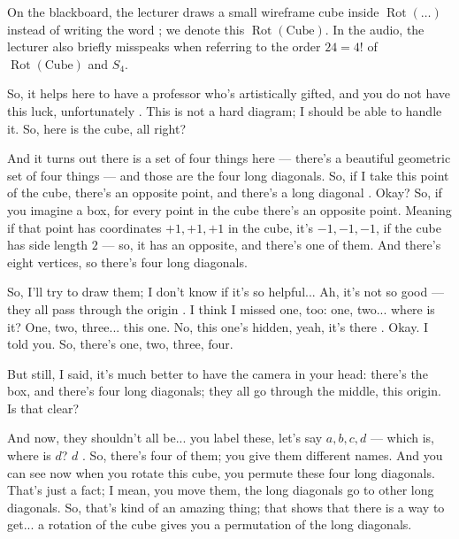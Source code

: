 \begin{aiNote}
On the blackboard, the lecturer draws a small wireframe cube inside $\operatorname{Rot}(\dots)$ instead of writing the word ; we denote this $\operatorname{Rot}(\text{Cube})$. In the audio, the lecturer also briefly misspeaks  when referring to the order $24 = 4!$ of $\operatorname{Rot}(\text{Cube})$ and $S_4$.
\end{aiNote}

\begin{speech}[00:38:42 - 00:40:54]
So, it helps here to have a professor who's artistically gifted, and you do not have this luck, unfortunately . This is not a hard diagram; I should be able to handle it. So, here is the cube, all right?

And it turns out there is a set of four things here --- there's a beautiful geometric set of four things --- and those are the four long diagonals. So, if I take this point of the cube, there's an opposite point, and there's a long diagonal . Okay? So, if you imagine a box, for every point in the cube there's an opposite point. Meaning if that point has coordinates $+1, +1, +1$ in the cube, it's $-1, -1, -1$, if the cube has side length $2$ --- so, it has an opposite, and there's one of them. And there's eight vertices, so there's four long diagonals.

So, I'll try to draw them; I don't know if it's so helpful...  Ah, it's not so good --- they all pass through the origin . I think I missed one, too: one, two... where is it? One, two, three... this one. No, this one's hidden, yeah, it's there . Okay. I told you. So, there's one, two, three, four.

But still, I said, it's much better to have the camera in your head: there's the box, and there's four long diagonals; they all go through the middle, this origin. Is that clear?

And now, they shouldn't all be... you label these, let's say $a, b, c, d$ --- which is, where is $d$? $d$ . So, there's four of them; you give them different names. And you can see now when you rotate this cube, you permute these four long diagonals. That's just a fact; I mean, you move them, the long diagonals go to other long diagonals. So, that's kind of an amazing thing; that shows that there is a way to get... a rotation of the cube gives you a permutation of the long diagonals.
\end{speech}

